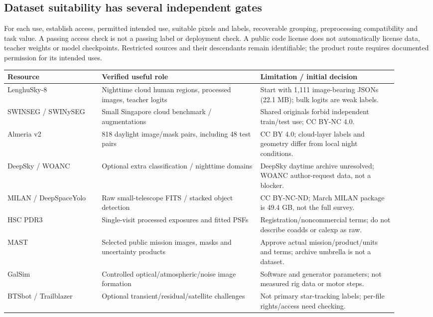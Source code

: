 \documentclass[11pt,a4paper]{article}
\begin{document}
\subsection{Dataset suitability has several independent gates}
For each use, establish access, permitted intended use, suitable pixels and
labels, recoverable grouping, preprocessing compatibility and task value.
A passing access check is not a passing label or deployment check. A public
code license does not automatically license data, teacher weights or model
checkpoints. Restricted sources and their descendants remain identifiable;
the product route requires documented permission for its intended uses.

\begin{longtable}{@{}L{0.22\linewidth}L{0.37\linewidth}L{0.32\linewidth}@{}}
\toprule Resource & Verified useful role & Limitation / initial decision\\\midrule\endhead
LenghuSky-8 & Nighttime cloud human regions, processed images, teacher logits &
Start with 1,111 image-bearing JSONs (22.1 MB); bulk logits are weak labels.\\
SWINSEG / SWINySEG & Small Singapore cloud benchmark / augmentations &
Shared originals forbid independent train/test use; CC BY-NC 4.0.\\
Almeria v2 & 818 daylight image/mask pairs, including 48 test pairs &
CC BY 4.0; cloud-layer labels and geometry differ from local night conditions.\\
DeepSky / WOANC & Optional extra classification / nighttime domains &
DeepSky daytime archive unresolved; WOANC author-request data, not a blocker.\\
MILAN / DeepSpaceYolo & Raw small-telescope FITS / stacked object detection &
CC BY-NC-ND; March MILAN package is 49.4 GB, not the full survey.\\
HSC PDR3 & Single-visit processed exposures and fitted PSFs &
Registration/noncommercial terms; do not describe coadds or calexp as raw.\\
MAST & Selected public mission images, masks and uncertainty products &
Approve actual mission/product/units and terms; archive umbrella is not a dataset.\\
GalSim & Controlled optical/atmospheric/noise image formation &
Software and generator parameters; not measured rig data or motor steps.\\
BTSbot / Trailblazer & Optional transient/residual/satellite challenges &
Not primary star-tracking labels; per-file rights/access need checking.\\

\end{longtable}
\end{document}
